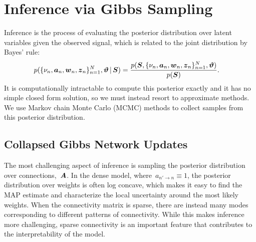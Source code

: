 \section{Inference via Gibbs Sampling}
Inference is the process of evaluating the posterior distribution over latent variables given the observed signal, which is related to the joint distribution by Bayes' rule:
\begin{align}
p(\{\nu_n, \boldsymbol{a}_n, \boldsymbol{w}_n, \boldsymbol{z}_n\}_{n=1}^N, \boldsymbol{\vartheta} \,|\, \boldsymbol{S})  
  &= \frac{p(\boldsymbol{S}, \{\nu_n, \boldsymbol{a}_n, \boldsymbol{w}_n, \boldsymbol{z}_n\}_{n=1}^N, \boldsymbol{\vartheta}) }{p(\boldsymbol{S})}.
\end{align}
It is computationally intractable to compute this posterior exactly and it has no simple closed form solution, so we must instead resort to approximate methods. 
We use Markov chain Monte Carlo (MCMC) methods to collect samples from this posterior distribution.

\subsection{Collapsed Gibbs Network Updates}
The most challenging aspect of inference is sampling the
posterior distribution over connections,~$\boldsymbol{A}$. In the
dense model, where~$a_{n' \to n} \equiv 1$, the posterior
distribution over weights is often log concave, which
makes it easy to find the MAP estimate and characterize
the local uncertainty around the most likely weights.
When the connectivity matrix is sparse, there are instead
many modes corresponding to different patterns of
connectivity. While this makes inference more challenging,
sparse connectivity is an important feature that
contributes to the interpretability of the model.

